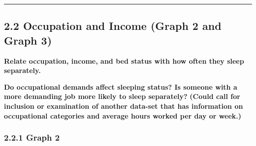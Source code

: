 \documentclass[
]{article}
\begin{document}
\begin{center}\rule{0.5\linewidth}{0.5pt}\end{center}

\hypertarget{occupation-and-income-graph-2-and-graph-3}{%
\subsection{2.2 Occupation and Income (Graph 2 and Graph
3)}\label{occupation-and-income-graph-2-and-graph-3}}

\textbf{Relate occupation, income, and bed status with how often they
sleep separately.}

\textbf{Do occupational demands affect sleeping status? Is someone with
a more demanding job more likely to sleep separately?} \textbf{(Could
call for inclusion or examination of another data-set that has
information on occupational categories and average hours worked per day
or week.)}

\hypertarget{graph-2}{%
\subsubsection{2.2.1 Graph 2}\label{graph-2}}
\end{document}
